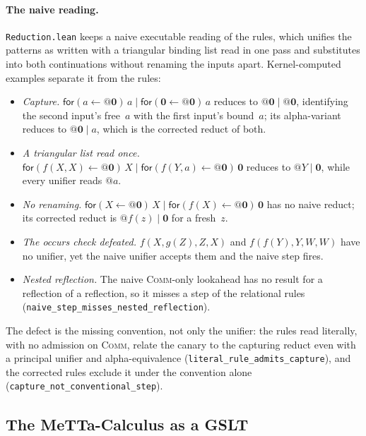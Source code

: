\documentclass[11pt]{article}
\theoremstyle{definition}
\theoremstyle{remark}
\begin{document}
\paragraph{The naive reading.}
\texttt{Reduction.lean} keeps a naive executable reading of the rules,
which unifies the patterns as written with a triangular binding list read
in one pass and substitutes into both continuations without renaming the
inputs apart.  Kernel-computed examples separate it from the rules:
\begin{itemize}[nosep]
\item \emph{Capture.}
  $\mathsf{for}(a \leftarrow @\mathbf{0})\,a \mathbin{|}
   \mathsf{for}(\mathbf{0} \leftarrow @\mathbf{0})\,a$ reduces to
  $@\mathbf{0} \mathbin{|} @\mathbf{0}$, identifying the second input's
  free~$a$ with the first input's bound~$a$; its alpha-variant reduces to
  $@\mathbf{0} \mathbin{|} a$, which is the corrected reduct of both.
\item \emph{A triangular list read once.}
  $\mathsf{for}(f(X,X) \leftarrow @\mathbf{0})\,X \mathbin{|}
   \mathsf{for}(f(Y,a) \leftarrow @\mathbf{0})\,\mathbf{0}$ reduces to
  $@Y \mathbin{|} \mathbf{0}$, while every unifier reads $@a$.
\item \emph{No renaming.}
  $\mathsf{for}(X \leftarrow @\mathbf{0})\,X \mathbin{|}
   \mathsf{for}(f(X) \leftarrow @\mathbf{0})\,\mathbf{0}$ has no naive
  reduct; its corrected reduct is $@f(z) \mathbin{|} \mathbf{0}$ for a
  fresh~$z$.
\item \emph{The occurs check defeated.} $f(X, g(Z), Z, X)$ and
  $f(f(Y), Y, W, W)$ have no unifier, yet the naive unifier accepts them and
  the naive step fires.
\item \emph{Nested reflection.} The naive \textsc{Comm}-only lookahead has
  no result for a reflection of a reflection, so it misses a step of the
  relational rules (\texttt{naive\_step\_misses\_nested\_reflection}).
\end{itemize}
The defect is the missing convention, not only the unifier: the rules read
literally, with no admission on \textsc{Comm}, relate the canary to the
capturing reduct even with a principal unifier and alpha-equivalence
(\texttt{literal\_rule\_admits\_capture}), and the corrected rules exclude
it under the convention alone (\texttt{capture\_not\_conventional\_step}).

\subsection{The MeTTa-Calculus as a GSLT}
\end{document}

